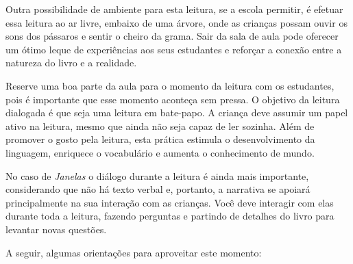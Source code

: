 \documentclass[11pt]{extarticle}
\begin{document}

Outra possibilidade de ambiente para esta leitura, se a escola permitir, 
é efetuar essa leitura ao ar livre, embaixo de uma árvore, onde as crianças 
possam ouvir os sons dos pássaros e sentir o cheiro da grama. Sair da sala 
de aula pode oferecer um ótimo leque de experiências aos seus estudantes e 
reforçar a conexão entre a natureza do livro e a realidade.  

Reserve uma boa parte da aula para o momento da leitura com os estudantes, 
pois é importante que esse momento aconteça sem pressa. O objetivo da 
leitura dialogada é que seja uma leitura em bate-papo. A criança deve 
assumir um papel ativo na leitura, mesmo que ainda não seja capaz de 
ler sozinha. Além de promover o gosto pela leitura, esta prática estimula 
o desenvolvimento da linguagem, enriquece o vocabulário e 
aumenta o conhecimento de mundo.

No caso de \textit{Janelas} o diálogo durante a leitura é 
ainda mais importante, considerando que não há texto verbal e, 
portanto, a narrativa se apoiará principalmente na sua interação com as crianças. 
Você deve interagir com elas durante toda a 
leitura, fazendo perguntas e partindo de detalhes do livro para 
levantar novas questões.

A seguir, algumas orientações para aproveitar este momento: 
\end{document}

